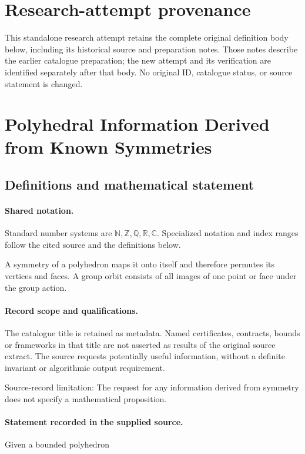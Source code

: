 \documentclass[11pt]{article}
\begin{document}
\section*{Research-attempt provenance}
This standalone research attempt retains the complete original definition body below,
including its historical source and preparation notes. Those notes describe the
earlier catalogue preparation; the new attempt and its verification are identified
separately after that body. No original ID, catalogue status, or source statement is changed.

\section{Polyhedral Information Derived from Known Symmetries}\label{statement}

\subsection{Definitions and mathematical statement}

\paragraph{Shared notation.}Standard number systems are $\mathbb N,\mathbb Z,\mathbb Q,\mathbb R,\mathbb C$. Specialized notation and index ranges follow the cited source and the definitions below.


A symmetry of a polyhedron maps it onto itself and therefore permutes its vertices and faces. A group orbit consists of all images of one point or face under the group action.
\paragraph{Record scope and qualifications.}
The catalogue title is retained as metadata. Named certificates, contracts, bounds or frameworks in that title are not asserted as results of the original source extract.
The source requests potentially useful information, without a definite invariant or algorithmic output requirement.

Source-record limitation: The request for any information derived from symmetry does not specify a mathematical proposition.
\paragraph{Statement recorded in the supplied source.}
Given a bounded polyhedron
\end{document}
